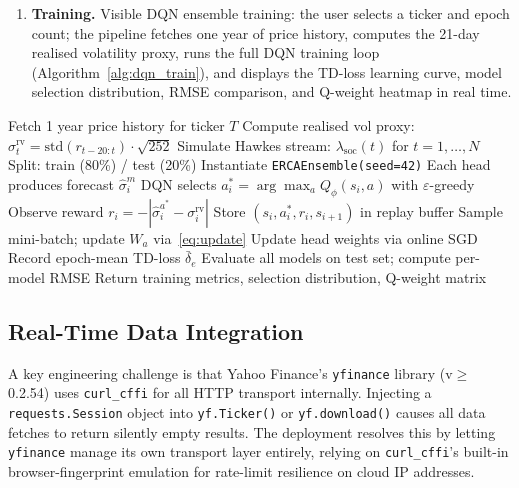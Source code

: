 \documentclass[10pt,twocolumn]{article}
\newcommand{\Zshort}{Z_{\mathrm{short}}}
\newcommand{\lamsoc}{\lambda_{\mathrm{soc}}}
\begin{document}
\begin{enumerate}[leftmargin=*,topsep=2pt,itemsep=1pt]
    ticker and lookback period; the pipeline fetches one year of price
    history, generates synthetic sentiment streams seeded from price
    returns, runs the full ERCA algorithm, and reports $\Zshort$ timeline,
    signal fires, Kelly evolution, and summary statistics.
  \item \textbf{Training.} Visible DQN ensemble training: the user selects
    a ticker and epoch count; the pipeline fetches one year of price
    history, computes the 21-day realised volatility proxy, runs the full
    DQN training loop (Algorithm~\ref{alg:dqn_train}), and displays the
    TD-loss learning curve, model selection distribution, RMSE comparison,
    and Q-weight heatmap in real time.
\end{enumerate}

\begin{algorithm}[htbp]
\caption{ERCA Training Tab --- DQN Pipeline}
\label{alg:dqn_train}
\begin{algorithmic}[1]
\small
\State Fetch 1 year price history for ticker $T$
\State Compute realised vol proxy:
  $\sigma^{\mathrm{rv}}_t=\mathrm{std}(r_{t-20:t})\cdot\sqrt{252}$
\State Simulate Hawkes stream: $\lamsoc(t)$ for $t=1,\ldots,N$
\State Split: train (80\%) / test (20\%)
\State Instantiate \texttt{ERCAEnsemble(seed=42)}
    \State Each head produces forecast $\hat{\sigma}^m_i$
    \State DQN selects $a^*_i=\arg\max_a Q_\phi(s_i,a)$ with $\varepsilon$-greedy
    \State Observe reward $r_i=-|\hat{\sigma}^{a^*}_i-\sigma^{\mathrm{rv}}_i|$
    \State Store $(s_i,a^*_i,r_i,s_{i+1})$ in replay buffer
    \State Sample mini-batch; update $W_a$ via~\eqref{eq:update}
    \State Update head weights via online SGD
  \EndFor
  \State Record epoch-mean TD-loss $\bar{\delta}_e$
\EndFor
\State Evaluate all models on test set; compute per-model RMSE
\State Return training metrics, selection distribution, Q-weight matrix
\end{algorithmic}
\end{algorithm}

\subsection{Real-Time Data Integration}

A key engineering challenge is that Yahoo Finance's \texttt{yfinance} library
(v$\ge$0.2.54) uses \texttt{curl\_cffi} for all HTTP transport internally.
Injecting a \texttt{requests.Session} object into \texttt{yf.Ticker()} or
\texttt{yf.download()} causes all data fetches to return silently empty
results. The deployment resolves this by letting \texttt{yfinance} manage its
own transport layer entirely, relying on \texttt{curl\_cffi}'s built-in
browser-fingerprint emulation for rate-limit resilience on cloud IP addresses.
\end{document}
